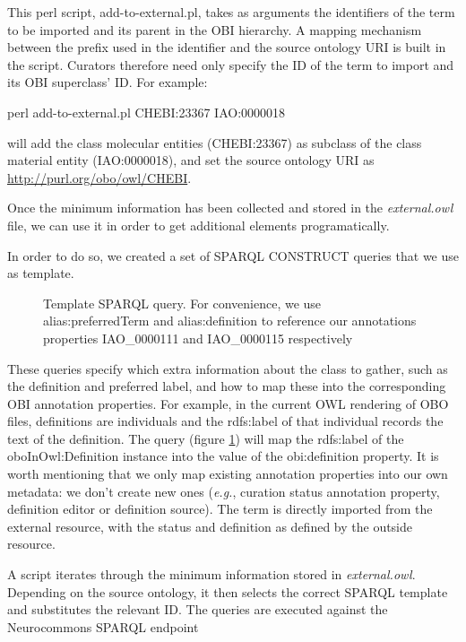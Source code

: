 \documentclass{elsart3p}    %
\def\sourcetabsize{4}
\newenvironment{sourcestyle}{\begin{scriptsize}}{\end{scriptsize}}
\begin{document}
This perl script, add-to-external.pl, takes as arguments the identifiers of the term to be imported and its parent in the OBI hierarchy.
A mapping mechanism between the prefix used in the identifier and the source ontology URI is built in the script.
Curators therefore need only specify the ID of the term to import and its OBI superclass' ID.
For example:


\begin{sourcestyle}%
\begin{verbatimtab}[\sourcetabsize]
     perl add-to-external.pl CHEBI:23367 IAO:0000018
\end{verbatimtab}%
\end{sourcestyle}
will add the class molecular entities (CHEBI:23367) as subclass of the class material entity (IAO:0000018), and set the source ontology URI as \url{http://purl.org/obo/owl/CHEBI}.

Once the minimum information has been collected and stored in the \emph{external.owl} file, we can use it in order to get additional elements programatically.


In order to do so, we created a set of SPARQL \cite{RefWorks:1531} CONSTRUCT queries  that we use as template. 
\begin{figure}[t]
\begin{sourcestyle}%
 
\end{sourcestyle}
\caption{Template SPARQL query. For convenience, we use alias:preferredTerm and
alias:definition to reference our annotations properties IAO\_0000111 and IAO\_0000115 respectively}
\label{fig:sparql}
\end{figure}
These queries specify which extra information about the class to gather, such as the definition and preferred label, and how to map these into the corresponding OBI annotation properties. 
For example, in the current OWL rendering of OBO files, definitions are individuals and the rdfs:label of that individual records the text of the definition.
The query (figure \ref{fig:sparql}) will map the rdfs:label of the oboInOwl:Definition instance into the value of the obi:definition property.
It is worth mentioning that we only map existing annotation properties into our own metadata: we don't create new ones (\emph{e.g.}, curation status annotation property, definition editor or definition source).
The term is directly imported from the external resource, with the status and definition as defined by the outside resource. 

A script iterates through the minimum information stored in \emph{external.owl}.
Depending on the source ontology, it then selects the correct SPARQL template and substitutes the relevant ID.
The queries are executed against the Neurocommons SPARQL endpoint\cite{RefWorks:1540}
\end{document}
